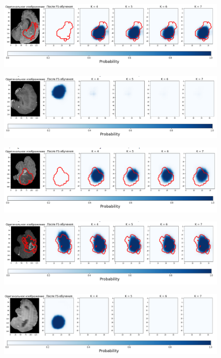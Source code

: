 \begin{figure}[h!] 
  \center
  \includegraphics [scale=0.7] {images/good_14.png}
\end{figure}

\begin{figure}[h!] 
  \center
  \includegraphics [scale=0.7] {images/good_15.png}
\end{figure}


\begin{figure}[h!] 
  \center
  \includegraphics [scale=0.7] {images/good_16.png}
\end{figure}


\begin{figure}[h!] 
  \center
  \includegraphics [scale=0.7] {images/good_17.png}
 \end{figure} 
  
  \begin{figure}[h!] 
  \center
  \includegraphics [scale=0.7] {images/good_18.png}
  \end{figure} 
  
